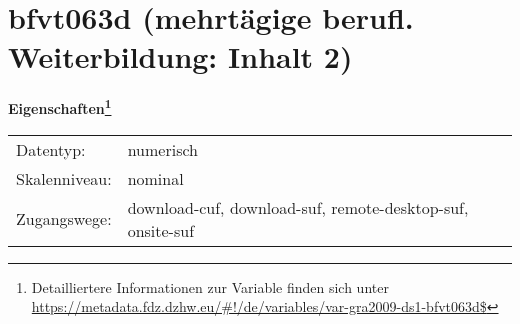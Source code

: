 
    \setcounter{footnote}{0}

    \vspace*{-1.8cm}
	\section{bfvt063d (mehrtägige berufl. Weiterbildung: Inhalt 2)}
	\label{section:bfvt063d}



    \vspace*{0.5cm}
    \noindent\textbf{Eigenschaften\footnote{Detailliertere Informationen zur Variable finden sich unter
		\url{https://metadata.fdz.dzhw.eu/\#!/de/variables/var-gra2009-ds1-bfvt063d$}}}\\
	\begin{tabularx}{\hsize}{@{}lX}
	Datentyp: & numerisch \\
	Skalenniveau: & nominal \\
	Zugangswege: &
	  download-cuf, 
	  download-suf, 
	  remote-desktop-suf, 
	  onsite-suf
 \\
    \end{tabularx}



